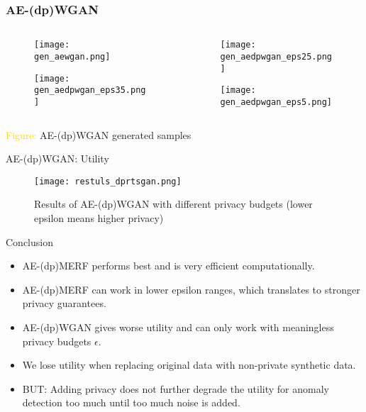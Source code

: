 \begin{frame}
    \frametitle{AE-(dp)WGAN}

    \begin{columns}
        \begin{column}{0.48\textwidth}
        \begin{figure}
            \centering
            \texttt{[image: gen\_aewgan.png]}
        \end{figure}
        \begin{figure}[h]
            \centering
            \texttt{[image: gen\_aedpwgan\_eps35.png]}
        \end{figure}
    \end{column}
    \begin{column}{0.48\textwidth}
        \begin{figure}
            \centering
            \texttt{[image: gen\_aedpwgan\_eps25.png]}
        \end{figure}
        \begin{figure}[h]
            \centering
            \texttt{[image: gen\_aedpwgan\_eps5.png]}
        \end{figure}
    \end{column}
    
    \end{columns}
    \centering
    \textcolor{gold}{Figure:} AE-(dp)WGAN generated samples

\end{frame}

\begin{frame}{AE-(dp)WGAN: Utility}
    \begin{figure}
        \centering
        \texttt{[image: restuls\_dprtsgan.png]}
        \caption{Results of AE-(dp)WGAN with different privacy budgets (lower epsilon means higher privacy)}
        \label{fig:enter-label}
    \end{figure}
\end{frame}

\begin{frame}{Conclusion}
    \begin{itemize}
        \item<1-> \alert{AE-(dp)MERF performs best} and is very efficient computationally.
        \item<2-> AE-(dp)MERF can work in \alert{lower epsilon ranges}, which translates to \alert{stronger privacy guarantees}.
        \item<3-> \alert{AE-(dp)WGAN gives worse utility} and can only work with meaningless privacy budgets $\epsilon$.
        \item<4-> We lose utility when \alert{replacing original data with non-private synthetic} data.
        \item<5-> BUT: Adding \alert{privacy does not further degrade the utility} for anomaly detection too much until too much noise is added.
    \end{itemize}
\end{frame}

